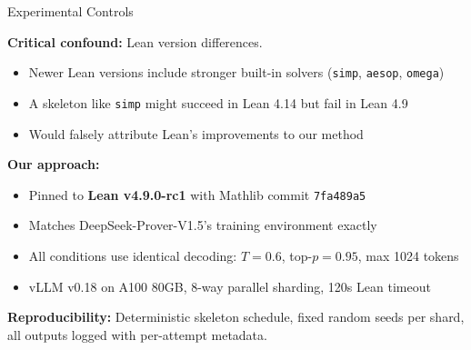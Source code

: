 \documentclass[aspectratio=169]{beamer}
\begin{document}
\begin{frame}{Experimental Controls}

\textbf{Critical confound:} Lean version differences.

\vspace{0.3em}
\begin{itemize}
    \item Newer Lean versions include stronger built-in solvers (\texttt{simp}, \texttt{aesop}, \texttt{omega})
    \item A skeleton like \texttt{simp} might succeed in Lean 4.14 but fail in Lean 4.9
    \item Would falsely attribute Lean's improvements to our method
\end{itemize}

\vspace{0.5em}
\textbf{Our approach:}
\begin{itemize}
    \item Pinned to \textbf{Lean v4.9.0-rc1} with Mathlib commit \texttt{7fa489a5}
    \item Matches DeepSeek-Prover-V1.5's training environment exactly
    \item All conditions use identical decoding: $T{=}0.6$, top-$p{=}0.95$, max 1024 tokens
    \item vLLM v0.18 on A100 80GB, 8-way parallel sharding, 120s Lean timeout
\end{itemize}

\vspace{0.5em}
\textbf{Reproducibility:} Deterministic skeleton schedule, fixed random seeds per shard, all outputs logged with per-attempt metadata.
\end{frame}
\end{document}

